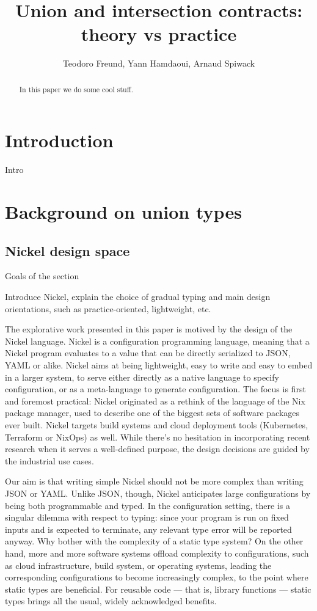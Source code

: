 \documentclass{article}
\title{Union and intersection contracts: theory vs practice}
\author{Teodoro Freund, Yann Hamdaoui, Arnaud Spiwack}
\begin{document}
\maketitle

\begin{abstract}
 In this paper we do some cool stuff.
\end{abstract}

\section*{Introduction}
Intro

\section{Background on union types}

\subsection{Nickel design space}

\color{red}Goals of the section

Introduce Nickel, explain the choice of gradual
typing and main design orientations, such as practice-oriented, lightweight,
etc.\vspace{0.5cm}\color{black}

The explorative work presented in this paper is motived by the design of the
Nickel language\cite{NickelRepo}. Nickel is a configuration programming
language, meaning that a Nickel program evaluates to a value that can be
directly serialized to JSON, YAML or alike.  Nickel aims at being lightweight,
easy to write and easy to embed in a larger system, to serve either directly as
a native language to specify configuration, or as a meta-language to generate
configuration. The focus is first and foremost practical: Nickel originated as a
rethink of the language of the Nix package manager, used to describe one of the
biggest sets of software packages ever built\cite{repology}.  Nickel targets
build systems and cloud deployment tools (Kubernetes, Terraform or NixOps) as
well. While there's no hesitation in incorporating recent research when it
serves a well-defined purpose, the design decisions are guided by the industrial
use cases.

Our aim is that writing simple Nickel should not be more complex than writing
JSON or YAML. Unlike JSON, though, Nickel anticipates large configurations by
being both programmable and typed. In the configuration setting, there is a
singular dilemma with respect to typing: since your program is run on fixed
inputs and is expected to terminate, any relevant type error will be reported
anyway.  Why bother with the complexity of a static type system? On the other
hand, more and more software systems offload complexity to configurations, such
as cloud infrastructure, build system, or operating systems, leading the
corresponding configurations to become increasingly complex, to the point where
static types are beneficial. For reusable code — that is, library functions —
static types brings all the usual, widely acknowledged benefits.
\end{document}

